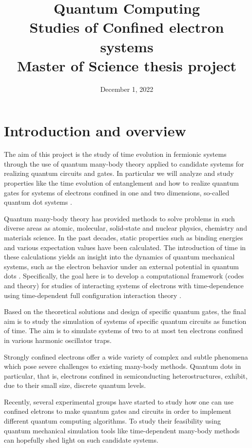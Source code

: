 \documentclass{article}
\title{Quantum Computing \\ \vspace{5px} \large Studies of Confined electron systems\\ \vspace{20px} \large Master of Science thesis project}
\date{December 1,  2022}
\begin{document}
\maketitle

\section*{Introduction and overview}

The aim of this project is the study of time evolution in fermionic
systems through the use of quantum many-body theory applied to
candidate systems for realizing quantum circuits and gates. In
particular we will analyze and study properties like the time evolution of
entanglement and how to realize quantum gates for systems of electrons
confined in one and two dimensions, so-called quantum dot systems \cite{Reimann2002}.

Quantum many-body
theory has provided methods to solve problems in such diverse areas as
atomic, molecular, solid-state and nuclear physics, chemistry and
materials science. In the past decades, static properties such as
binding energies and various expectation values have been
calculated. The introduction of time in these calculations yields an
insight into the dynamics of quantum mechanical systems, such as the
electron behavior under an external potential in quantum dots \cite{Reimann2002}.
Specifically, the goal here is to develop a computational framework (codes and theory) for studies of
interacting systems of electrons with time-dependence using time-dependent full
configuration interaction theory \cite{Skattum2013,Hochstuhl2014}.

Based on the theoretical solutions and design of specific quantum
gates, the final aim is to study the simulation of systems of specific quantum
circuits as function of time.  The aim is to simulate systems of two
to at most ten electrons confined in various harmonic oscillator
traps.

Strongly confined electrons offer a wide variety of complex and subtle
phenomena which pose severe challenges to existing many-body
methods. Quantum dots in particular, that is, electrons confined in
semiconducting heterostructures, exhibit, due to their small size,
discrete quantum levels.

Recently, several experimental groups
have started to study how one can use confined eletrons to make
quantum gates and circuits in order to implement different quantum
computing algorithms. To study their feasibility using quantum
mechanical simulation tools like time-dependent many-body methods can
hopefully shed light on such candidate systems.
\end{document}
